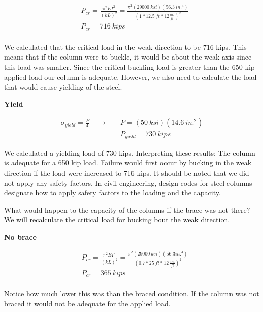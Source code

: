 \documentclass[
  letterpaper,
  DIV=11,
  numbers=noendperiod]{scrreprt}
\theoremstyle{definition}
\theoremstyle{remark}
\begin{document}
\begin{tcolorbox}
\begin{tcolorbox}
\[
\begin{aligned}
& P_{cr}=\frac{\pi^2 E I^2}{(k L)^2}=\frac{\pi^2(29000{~ksi})(56.3{~in.^4})}{\left(1*12.5{~ft}*12\frac{in.}{ft}\right)^2} \\
& P_{c r}=716{~kips} \\
\end{aligned}
\]

We calculated that the critical load in the weak direction to be 716
kips. This means that if the column were to buckle, it would be about
the weak axis since this load was smaller. Since the critical buckling
load is greater than the 650 kip applied load our column is adequate.
However, we also need to calculate the load that would cause yielding of
the steel.

\textbf{Yield}

\[
\begin{aligned}
\sigma_{yield}=\frac{P}{4} \quad\rightarrow\quad &P=(50{~ksi})(14.6{~in.^2}) \\
& P_{yield}=730{~kips}
\end{aligned}
\]

We calculated a yielding load of 730 kips. Interpreting these results:
The column is adequate for a 650 kip load. Failure would first occur by
bucking in the weak direction if the load were increased to 716 kips. It
should be noted that we did not apply any safety factors. In civil
engineering, design codes for steel columns designate how to apply
safety factors to the loading and the capacity.

What would happen to the capacity of the columns if the brace was not
there? We will recalculate the critical load for bucking bout the weak
direction.

\textbf{No brace}

\[
\begin{aligned}
& P_{cr}=\frac{\pi^2 E I^2}{(k L)^2}=\frac{\pi^2(29000{~ksi})(56.3{in.^4})}{\left(0.7*25{~ft}*12~\frac{in.}{ft}\right)^2} \\
& P_{c r}=365{~kips} \\
\end{aligned}
\]

Notice how much lower this was than the braced condition. If the column
was not braced it would not be adequate for the applied load.

\end{tcolorbox}

\end{tcolorbox}
\end{document}
